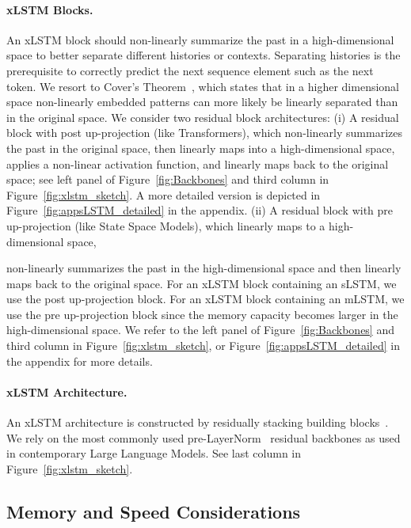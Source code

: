\paragraph{xLSTM Blocks.}
\label{sec:xLSTMblock}
An xLSTM block should non-linearly summarize the past in a high-dimensional space to better separate different histories or contexts. Separating histories is the prerequisite to correctly predict the next sequence element such as the next token. We resort to Cover’s Theorem~\citep{Cover:65}, which states that in a higher dimensional space non-linearly embedded patterns can more likely be linearly separated than in the original space. We consider two residual block architectures: (i) A residual block with post up-projection (like Transformers), which non-linearly summarizes the past in the original space, then linearly maps into a high-dimensional space, applies a non-linear activation function, and linearly maps back to the original space; see left panel of Figure~\ref{fig:Backbones}
and third column in Figure~\ref{fig:xlstm_sketch}. 
A more detailed version is depicted in Figure~\ref{fig:appsLSTM_detailed}
in the appendix. (ii) A residual block with pre up-projection (like State Space Models), which linearly maps to a high-dimensional space, 

non-linearly summarizes the past in the high-dimensional space and then linearly maps back to the original space. For an xLSTM block containing an sLSTM, we use the post up-projection block. For an xLSTM block containing an mLSTM, we use the pre up-projection block since the memory capacity becomes larger in the high-dimensional space. We refer to the left panel of Figure~\ref{fig:Backbones}
and third column in Figure~\ref{fig:xlstm_sketch}, 
or Figure~\ref{fig:appsLSTM_detailed} in the appendix for more details.

\paragraph{xLSTM Architecture. }
\label{sec:xLSTMarchitecure}
An xLSTM architecture is constructed by residually stacking building blocks~\citep{Srivastava:15,He:16}. We rely on the most commonly used pre-LayerNorm~\citep{Ba:16b} residual backbones as used in contemporary Large Language Models. See last column in Figure~\ref{fig:xlstm_sketch}. 

\subsection{Memory and Speed Considerations}

